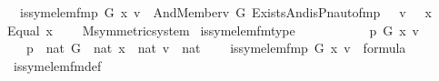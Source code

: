 \begin{isabellebody}
\ \ {\isachardoublequoteopen}is{\isacharunderscore}{\kern0pt}sym{\isacharunderscore}{\kern0pt}elem{\isacharunderscore}{\kern0pt}fm{\isacharparenleft}{\kern0pt}p{\isacharcomma}{\kern0pt}\ G{\isacharcomma}{\kern0pt}\ x{\isacharcomma}{\kern0pt}\ v{\isacharparenright}{\kern0pt}\ {\isasymequiv}\ And{\isacharparenleft}{\kern0pt}Member{\isacharparenleft}{\kern0pt}v{\isacharcomma}{\kern0pt}\ G{\isacharparenright}{\kern0pt}{\isacharcomma}{\kern0pt}\ Exists{\isacharparenleft}{\kern0pt}And{\isacharparenleft}{\kern0pt}is{\isacharunderscore}{\kern0pt}Pn{\isacharunderscore}{\kern0pt}auto{\isacharunderscore}{\kern0pt}fm{\isacharparenleft}{\kern0pt}p\ {\isacharhash}{\kern0pt}{\isacharplus}{\kern0pt}\ {}{\isacharcomma}{\kern0pt}\ v\ {\isacharhash}{\kern0pt}{\isacharplus}{\kern0pt}\ {}{\isacharcomma}{\kern0pt}\ x\ {\isacharhash}{\kern0pt}{\isacharplus}{\kern0pt}\ {}{\isacharcomma}{\kern0pt}\ {}{\isacharparenright}{\kern0pt}{\isacharcomma}{\kern0pt}\ Equal{\isacharparenleft}{\kern0pt}{}{\isacharcomma}{\kern0pt}\ x\ {\isacharhash}{\kern0pt}{\isacharplus}{\kern0pt}\ {}{\isacharparenright}{\kern0pt}{\isacharparenright}{\kern0pt}{\isacharparenright}{\kern0pt}{\isacharparenright}{\kern0pt}{\isachardoublequoteclose}\ \isanewline
\isanewline
\isanewline
{}\isamarkupfalse%
\ M{\isacharunderscore}{\kern0pt}symmetric{\isacharunderscore}{\kern0pt}system\isanewline
{}\isanewline
\isanewline
{}\isamarkupfalse%
\ is{\isacharunderscore}{\kern0pt}sym{\isacharunderscore}{\kern0pt}elem{\isacharunderscore}{\kern0pt}fm{\isacharunderscore}{\kern0pt}type\ {\isacharcolon}{\kern0pt}\ \ \ \ \ \ \ \isanewline
\ \ \ p\ G\ x\ v\isanewline
\ \ \ {\isachardoublequoteopen}p\ {\isasymin}\ nat{\isachardoublequoteclose}\ {\isachardoublequoteopen}G\ {\isasymin}\ nat{\isachardoublequoteclose}\ {\isachardoublequoteopen}x\ {\isasymin}\ nat{\isachardoublequoteclose}\ {\isachardoublequoteopen}v\ {\isasymin}\ nat{\isachardoublequoteclose}\ \isanewline
\ \ \ {\isachardoublequoteopen}is{\isacharunderscore}{\kern0pt}sym{\isacharunderscore}{\kern0pt}elem{\isacharunderscore}{\kern0pt}fm{\isacharparenleft}{\kern0pt}p{\isacharcomma}{\kern0pt}\ G{\isacharcomma}{\kern0pt}\ x{\isacharcomma}{\kern0pt}\ v{\isacharparenright}{\kern0pt}\ {\isasymin}\ formula{\isachardoublequoteclose}\ \isanewline
%
\isadelimproof
\isanewline
\ \ %
\endisadelimproof
%
\isatagproof
{}\isamarkupfalse%
\ is{\isacharunderscore}{\kern0pt}sym{\isacharunderscore}{\kern0pt}elem{\isacharunderscore}{\kern0pt}fm{\isacharunderscore}{\kern0pt}def\ \isanewline

\end{isabellebody}
